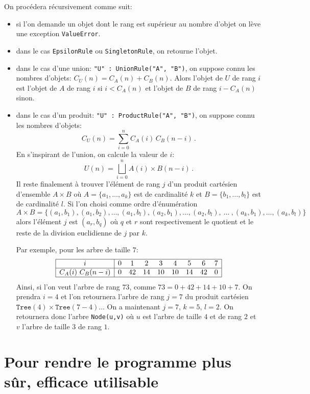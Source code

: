 \documentclass[11pt]{article}
\begin{document}
On procédera récursivement comme suit:
\begin{itemize}
\item si l'on demande un objet dont le rang est supérieur au nombre d'objet on
  lève une exception \texttt{ValueError}.
\item dans le cas \texttt{EpsilonRule} ou \texttt{SingletonRule}, on retourne
  l'objet.
\item dans le cas d'une union: \texttt{"U" : UnionRule("A", "B")}, on suppose
  connu les nombres d'objets: $C_U(n) = C_A(n) + C_B(n)$. Alors l'objet de $U$
  de rang $i$ est l'objet de $A$ de rang $i$ si $i<C_A(n)$ et l'objet de $B$
  de rang $i-C_A(n)$ sinon.
\item dans le cas d'un produit: \texttt{"U" : ProductRule("A", "B")}, on suppose
  connu les nombres d'objets:
  $$
  C_U(n) = \sum_{i=0}^n C_A(i)\,C_B(n-i)\,.
  $$
  En s'inspirant de l'union, on calcule la valeur de $i$:
  $$
  U(n) = \bigsqcup_{i=0}^n A(i) \times B(n-i)\,.
  $$
  Il reste finalement à trouver l'élément de rang $j$ d'un produit cartésien
  d'ensemble $A\times B$ où $A=\{a_1,\dots,a_k\}$ est de cardinalité $k$ et
  $B=\{b_1,\dots,b_l\}$ est de cardinalité $l$. Si l'on choisi comme ordre
  d'énumération
  $$
  A\times B =\{(a_1, b_1), (a_1, b_2), \dots, (a_1, b_l),
               (a_2, b_1), \dots, (a_2, b_l),
               \ \dots\ ,
               (a_k, b_1), \dots, (a_k, b_l)\}
  $$
  alors l'élément $j$ est $(a_{r}, b_{q})$ où $q$ et $r$ sont respectivement
  le quotient et le reste de la division euclidienne de $j$ par $k$.

  Par exemple, pour les arbre de taille $7$:
  $$
  \begin{array}{|c|cccccccc|}
    \hline
    i           & 0&  1&  2&  3&  4&  5&  6& 7\\
    \hline
    C_A(i)\ C_B(n-i)  & 0& 42& 14& 10& 10& 14& 42& 0\\
    \hline
  \end{array}
  $$
  Ainsi, si l'on veut l'arbre de rang $73$, comme $73 = 0+42+14+10+7$. On
  prendra $i=4$ et l'on retournera l'arbre de rang $j=7$ du produit cartésien
  $\texttt{Tree}(4) \times \texttt{Tree}(7-4)$...  On a maintenant $j=7$,
  $k=5$, $l=2$. On retournera donc l'arbre \texttt{Node(u,v)} où $u$ est
  l'arbre de taille $4$ et de rang $2$ et $v$ l'arbre de taille $3$ de rang
  $1$.
\end{itemize}

\section{Pour rendre le programme plus sûr, efficace utilisable}
\end{document}
